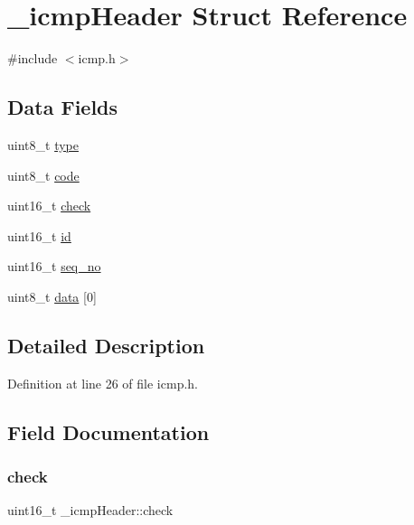 \hypertarget{struct__icmpHeader}{}\section{\+\_\+icmp\+Header Struct Reference}
\label{struct__icmpHeader}


{\ttfamily \#include $<$icmp.\+h$>$}

\subsection*{Data Fields}
\begin{DoxyCompactItemize}
\item 
uint8\+\_\+t \hyperlink{struct__icmpHeader_ac5cb21998813ca6fba404cd504fbada0}{type}
\item 
uint8\+\_\+t \hyperlink{struct__icmpHeader_a143f787e775af41d31936c1ced3f569c}{code}
\item 
uint16\+\_\+t \hyperlink{struct__icmpHeader_af2ca43ba9768757f4d04006a2d03fcc5}{check}
\item 
uint16\+\_\+t \hyperlink{struct__icmpHeader_a3f07c14263b87401727edf31865bd15c}{id}
\item 
uint16\+\_\+t \hyperlink{struct__icmpHeader_af8216680fadf3c4ae5f989de1d3babf0}{seq\+\_\+no}
\item 
uint8\+\_\+t \hyperlink{struct__icmpHeader_a6e63c5802b87f37b0f686e16934048e5}{data} \mbox{[}0\mbox{]}
\end{DoxyCompactItemize}


\subsection{Detailed Description}


Definition at line 26 of file icmp.\+h.



\subsection{Field Documentation}
\mbox{\label{struct__icmpHeader_af2ca43ba9768757f4d04006a2d03fcc5}} 
\subsubsection{\texorpdfstring{check}{check}}
{\footnotesize\ttfamily uint16\+\_\+t \+\_\+icmp\+Header\+::check}



